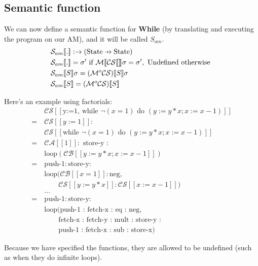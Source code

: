 \documentclass[11pt,a4paper,titlepage,dvipsnames,cmyk]{scrartcl}
\newcommand\pfun{\mathrel{\ooalign{\hfil$\mapstochar\mkern5mu$\hfil\cr$\to$\cr}}}
\begin{document}
\subsection{Semantic function}%
\label{sub:Semantic-function}
We can now define a semantic function for \textbf{While} (by translating
and executing the program on our AM), and it will be called $S_{am}$.
\begin{align*}
    &\mathcal{S}_{am} [\![.]\!]: \rightarrow (\text{State}\pfun\text{State}) \\
    &\mathcal{S}_{am} [\![.]\!] = \sigma' \text{ if }
    \mathcal{M}[\![\mathcal{CS}[\![]\!]\!] \sigma = \sigma', \text{
    Undefined otherwise } \\
    &\mathcal{S}_{am} [\![S]\!] \sigma = (\mathcal{M} ^o
    \mathcal{CS})[\![S]\!] \sigma \\
    &\mathcal{S}_{am} [\![S]\!] = (\mathcal{M} ^o
    \mathcal{CS})[\![S]\!] \\
\end{align*}

Here's an example using factorials:
\begin{align*}
    &\mathcal{CS} [\![\text{y:=1, while } \neg (x=1) \text{ do } (y:=y * x;
    x:=x-1)]\!] \\
    = \ &\mathcal{CS}[\![y:=1]\!]: \\
      &\mathcal{ CS}[\![\text{while } \neg (x=1) \text{ do }
      (y:=y*x;x:=x-1)]\!] \\
    = \ &\mathcal{CA}[\![1]\!]: \text{ store-y }: \\
      &\text{loop}(\mathcal{CB}[\![y:=y * x; x:= x-1]\!]) \\
    = \ &\text{push-1}: \text{store-y}: \\
      &\text{loop}(\mathcal{CB}[\![x=1]\!]: \text{neg}, \\
      &\quad \quad \mathcal{CS}[\![y:=y * x]\!] : \mathcal{CS}[\![x:=x-1]\!])\\
    &\dots \\
    = \ &\text{push-1}:\text{store-y}: \\
    &\text{loop}(\text{push-1 : fetch-x : eq : neg,} \\
    &\quad \quad \text{fetch-x : fetch-y : mult : store-y :} \\
    &\quad  \quad\text{push-1 : fetch-x : sub : store-x})
\end{align*}

Because we have specified the functions, they are allowed to be undefined
(such as when they do infinite loops). 
\end{document}
